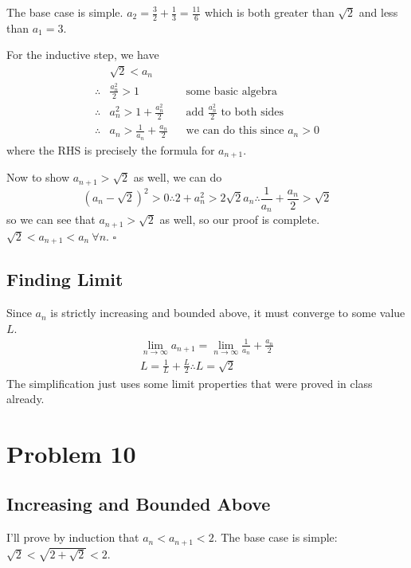 \documentclass[12pt]{article}
\begin{document}
The base case is simple.
$a_2=\frac{3}{2}+\frac{1}{3}=\frac{11}{6}$ which is both greater than $\sqrt{2}$ and less than $a_1=3$.

For the inductive step, we have
\begin{align*}
               & \sqrt{2} < a_n                                                                      \\
  \therefore{} & \frac{a_n^2}{2} > 1                 &  & \text{some basic algebra}                  \\
  \therefore{} & a_n^2 > 1 + \frac{a_n^2}{2}         &  & \text{add $\frac{a_n^2}{2}$ to both sides} \\
  \therefore{} & a_n > \frac{1}{a_n} + \frac{a_n}{2} &  & \text{we can do this since $a_n > 0$}
\end{align*}
where the RHS is precisely the formula for $a_{n+1}$.

Now to show $a_{n+1} > \sqrt{2}$ as well, we can do
\[\left(a_n - \sqrt{2}\right)^2 > 0 \therefore 2 + a_n^2 > 2\sqrt{2}a_n \therefore \frac{1}{a_n} + \frac{a_n}{2} > \sqrt{2}\]
so we can see that $a_{n+1} > \sqrt{2}$ as well, so our proof is complete. $\sqrt{2} < a_{n+1} < a_n\ \forall n$. $\square$

\subsection{Finding Limit}

Since $a_n$ is strictly increasing and bounded above, it must converge to some value $L$.
\begin{gather*}
  \lim_{n \to \infty} a_{n+1} = \lim_{n \to \infty} \frac{1}{a_n}+\frac{a_n}{2} \\
  L = \frac{1}{L} + \frac{L}{2} \therefore L=\boxed{\sqrt{2}}
\end{gather*}
The simplification just uses some limit properties that were proved in class already.

\section{Problem 10}

\subsection{Increasing and Bounded Above}

I'll prove by induction that $a_n < a_{n+1} < 2$.
The base case is simple: $\sqrt{2} < \sqrt{2+\sqrt{2}} < 2$.
\end{document}
